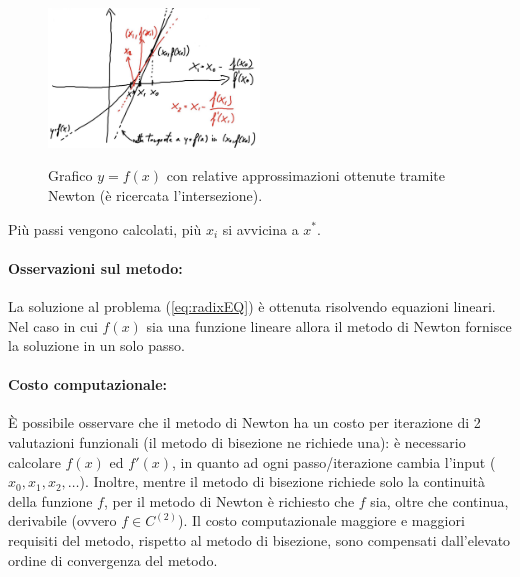 
\begin{figure}
	\centering
	\includegraphics[width=0.5\textwidth]{immagini/GraficoRettaTangNewton.jpg}
	\label{fig:grafico_retta_tangente_metodo_newton}
	\caption{Grafico $y=f(x)$ con relative approssimazioni ottenute tramite Newton (è ricercata l'intersezione).}
\end{figure}

Più passi vengono calcolati, più $x_i$ si avvicina a $x^*$.

\paragraph{Osservazioni sul metodo:} La soluzione al problema (\ref{eq:radixEQ}) è ottenuta risolvendo \gls{equazioni lineari}. Nel caso in cui $f(x)$ sia una \gls{funzione lineare} allora il metodo di Newton fornisce la soluzione in un solo passo.

\paragraph{Costo computazionale:}È possibile osservare che il metodo di Newton ha un costo per iterazione di 2 valutazioni funzionali (il metodo di bisezione ne richiede una): è necessario calcolare $f(x)$ ed $f'(x)$, in quanto ad ogni passo/iterazione cambia l'input ($x_0, x_1, x_2, \hdots$).
Inoltre, mentre il metodo di bisezione richiede solo la continuità della funzione $f$, per il metodo di Newton è richiesto che $f$ sia, oltre che continua, derivabile (ovvero $f\in C^{(2)}$).
Il costo computazionale maggiore e maggiori requisiti del metodo, rispetto al metodo di bisezione, sono compensati dall'elevato ordine di convergenza del metodo.

